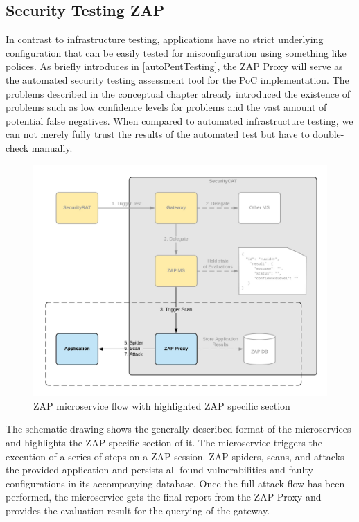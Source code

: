 \subsection{Security Testing ZAP}
\label{zapTesting}
In contrast to infrastructure testing, applications have no strict underlying configuration that can be easily tested for misconfiguration using something like polices.
As briefly introduces in \ref{autoPentTesting}, the ZAP Proxy will serve as the automated security testing assessment tool for the PoC implementation.
The problems described in the conceptual chapter already introduced the existence of problems such as low confidence levels for problems and the vast amount of potential false negatives. When compared to automated infrastructure testing, we can not merely fully trust the results of the automated test but have to double-check manually.

\begin{figure}[ht!]
\begin{center}
\includegraphics[width=15cm]{ZAP_MS_flow.jpg}
\end{center}
\caption[ZAP microservice flow with highlighted ZAP specific section]{ZAP microservice flow with highlighted ZAP specific section}
\end{figure}

The schematic drawing shows the generally described format of the microservices and highlights the ZAP specific section of it. The microservice triggers the execution of a series of steps on a ZAP session. ZAP spiders, scans, and attacks the provided application and persists all found vulnerabilities and faulty configurations in its accompanying database. Once the full attack flow has been performed, the microservice gets the final report from the ZAP Proxy and provides the evaluation result for the querying of the gateway.

